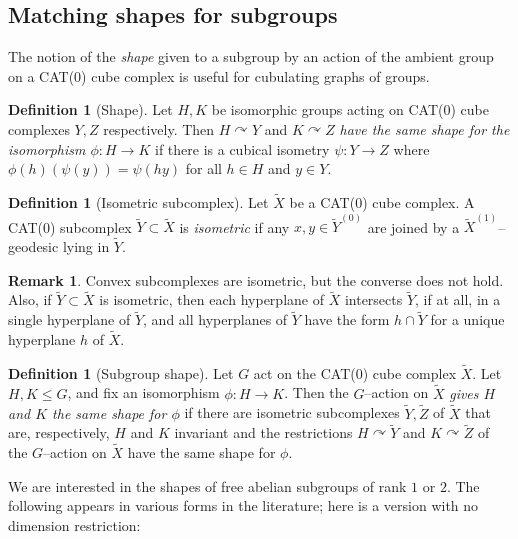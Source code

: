 \documentclass[11pt,oneside]{amsart}
\theoremstyle{definition}
\newtheorem{defn}[thm]{Definition}
\newtheorem{rem}[thm]{Remark}
\begin{document}
\subsection{Matching shapes for subgroups}\label{subsec:shape}
The notion of the \emph{shape} given to a subgroup by an action of the ambient group on a CAT(0) cube complex is useful for cubulating graphs of groups.

\begin{defn}[Shape]\label{defn:shape}
Let $H,K$ be isomorphic groups acting on CAT(0) cube complexes $Y,Z$ respectively.  Then $H\curvearrowright Y$ and $K\curvearrowright Z$ \emph{have the same shape for the isomorphism $\phi:H\to K$} if there is a cubical isometry $\psi:Y\to Z$ where $\phi(h)(\psi(y))=\psi(hy)$ for all $h\in H$ and $y\in Y$.  
\end{defn}

\begin{defn}[Isometric subcomplex]\label{defn:isometric-subcomplex}
Let $\widetilde X$ be a CAT(0) cube complex.  A CAT(0) subcomplex $\widetilde Y\subset\widetilde X$ is \emph{isometric} if any $x,y\in\widetilde Y^{(0)}$ are joined by a $\widetilde X^{(1)}$--geodesic lying in $\widetilde Y$.
\end{defn}

\begin{rem}\label{rem:isometric-subcomplex}
Convex subcomplexes are isometric, but the converse does not hold.  Also, if $\widetilde Y\subset\widetilde X$ is isometric, then each hyperplane of $\widetilde X$ intersects $\widetilde Y$, if at all, in a single hyperplane of $\widetilde Y$, and all hyperplanes of $\widetilde Y$ have the form $h\cap \widetilde Y$ for a unique hyperplane $h$ of $\widetilde X$.    \end{rem}


\begin{defn}[Subgroup shape]\label{defn:subgroup-shape}
Let $G$ act on the CAT(0) cube complex $\widetilde X$.  Let $H,K\leq G$, and fix an isomorphism $\phi:H\to K$.  Then the $G$--action on $\widetilde X$ \emph{gives $H$ and $K$ the same shape for $\phi$} if there are isometric subcomplexes $\widetilde Y,\widetilde Z$ of $\widetilde X$ that are, respectively, $H$ and $K$ invariant and the restrictions $H\curvearrowright \widetilde Y$ and $K\curvearrowright \widetilde Z$ of the $G$--action on $\widetilde X$ have the same shape for $\phi$.
\end{defn}

We are interested in the shapes of free abelian subgroups of rank $1$ or $2$.  The following appears in various forms in the literature; here is a version with no dimension restriction:
\end{document}
